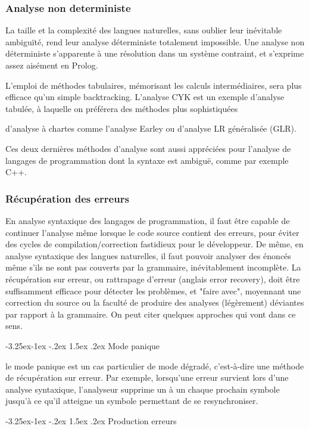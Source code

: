\documentclass{article}
\makeatletter
\newcounter {subsubsubsection}[subsubsection]
\newcommand\subsubsubsection{\@startsection{subsubsubsection}{4}{\z@}%
                                     {-3.25ex\@plus -1ex \@minus -.2ex}%
                                     {1.5ex \@plus .2ex}%
                                     {\normalfont\normalsize\bfseries}}
\makeatother
\begin{document}
\subsubsection{Analyse non deterministe}

La taille et la complexité des langues naturelles, sans oublier leur inévitable ambiguïté, rend leur analyse déterministe totalement impossible. Une analyse non déterministe s'apparente à une résolution dans un système contraint, et s'exprime assez aisément en Prolog.

L'emploi de méthodes tabulaires, mémorisant les calculs intermédiaires, sera plus efficace qu'un simple backtracking. L'analyse CYK est un exemple d'analyse tabulée, à laquelle on préférera des méthodes plus sophistiquées

    d'analyse à chartes comme l'analyse Earley
    ou d'analyse LR généralisée (GLR).

Ces deux dernières méthodes d'analyse sont aussi appréciées pour l'analyse de langages de programmation dont la syntaxe est ambiguë, comme par exemple C++.

\subsubsection{Récupération des erreurs}

En analyse syntaxique des langages de programmation, il faut être capable de continuer l'analyse même lorsque le code source contient des erreurs, pour éviter des cycles de compilation/correction fastidieux pour le développeur. De même, en analyse syntaxique des langues naturelles, il faut pouvoir analyser des énoncés même s'ils ne sont pas couverts par la grammaire, inévitablement incomplète. La récupération sur erreur, ou rattrapage d'erreur (anglais error recovery), doit être suffisamment efficace pour détecter les problèmes, et "faire avec", moyennant une correction du source ou la faculté de produire des analyses (légèrement) déviantes par rapport à la grammaire. On peut citer quelques approches qui vont dans ce sens.

\subsubsubsection{Mode panique}

le mode panique \cite{refModePanique} est un cas particulier de mode dégradé, c’est-à-dire une méthode de récupération sur erreur.
Par exemple, lorsqu'une erreur survient lors d'une analyse syntaxique, l'analyseur supprime un à un chaque prochain symbole jusqu'à ce qu'il atteigne un symbole permettant de se resynchroniser.

\subsubsubsection{Production erreurs}
\end{document}
